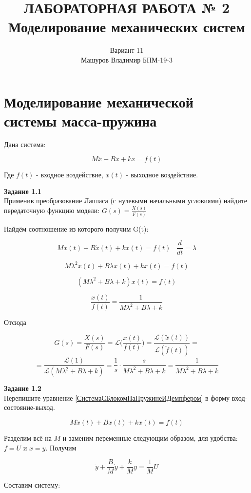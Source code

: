 \documentclass[a4paper, 12pt]{article}
\title{ЛАБОРАТОРНАЯ РАБОТА № 2 \\
Моделирование механических систем
}
\author{Вариант 11 \\ Машуров Владимир БПМ-19-3}
\begin{document}
\maketitle
\thispagestyle{empty}
\newpage
\tableofcontents

\section{Моделирование механической системы масса-пружина}

Дана система:

\begin{equation}
M\ddot{x} + B\dot{x} + kx = f(t)
\label{СистемаСБлокомНаПружинеИДемпфером}
\end{equation}

Где $f(t)$ - входное воздействие, $x(t)$ - выходное воздействие.
 
\textbf{Задание 1.1 } \\
Применив преобразование Лапласа (с нулевыми начальными условиями) найдите передаточную функцию модели: $ G(s) = \frac{X(s)}{F(s)} $ 

Найдём соотношение из которого получим G(t):


$$M\ddot{x}(t) + B\dot{x}(t) + kx(t) = f(t) \; \; \; \frac{d}{dt} = \lambda $$

$$ M\lambda^2x(t) + B\lambda x(t) + kx(t) = f(t) $$

$$ (M\lambda^2 + B\lambda + k)x(t) = f(t) $$

$$ \frac{x(t)}{f(t)} = \frac{1}{M\lambda^2 + B\lambda + k} $$

Отсюда

$$ G(s) = \frac{X(s)}{F(s)} = \mathcal{L} \bigg( \frac{x(t)}{f(t)} \bigg) = \frac{\mathcal{L}(\tilde{x}(t))}{\mathcal{L}(\tilde{f}(t))} = $$
$$ = \frac{\mathcal{L}(1)}{\mathcal{L}(M\lambda^2 + B\lambda + k)} =  \frac{1}{s} \cdot \frac{s}{M\lambda^2 + B\lambda + k} = \frac{1}{M\lambda^2 + B\lambda + k} $$

\textbf{Задание 1.2 } \\
Перепишите уравнение \ref{СистемаСБлокомНаПружинеИДемпфером} в форму вход-состояние-выход.

$$M\ddot{x}(t) + B\dot{x}(t) + kx(t) = f(t) $$ 

Разделим всё на $M$ и заменим переменные следующим образом, для удобства: $f = U$ и $x = y$. Получим 

$$ \ddot{y} + \frac{B}{M}\dot{y} + \frac{k}{M}y = \frac{1}{M}U $$

Составим систему:
\end{document}
